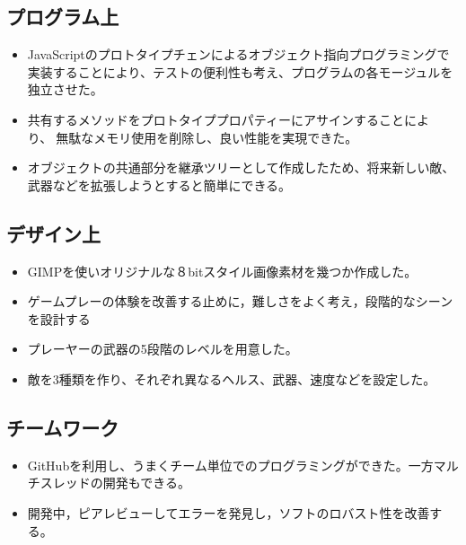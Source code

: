 	\subsection{プログラム上}
		\begin{itemize}
			\item JavaScriptのプロトタイプチェンによるオブジェクト指向プログラミングで実装することにより、テストの便利性も考え、プログラムの各モージュルを独立させた。
			\item 共有するメソッドをプロトタイププロパティーにアサインすることにより、無駄なメモリ使用を削除し、良い性能を実現できた。
			\item オブジェクトの共通部分を継承ツリーとして作成したため、将来新しい敵、武器などを拡張しようとすると簡単にできる。
		\end{itemize}
	\subsection{デザイン上}
		\begin{itemize}
			\item GIMPを使いオリジナルな８bitスタイル画像素材を幾つか作成した。
			\item ゲームプレーの体験を改善する止めに，難しさをよく考え，段階的なシーンを設計する
			\item プレーヤーの武器の5段階のレベルを用意した。
			\item 敵を3種類を作り、それぞれ異なるヘルス、武器、速度などを設定した。
		\end{itemize}
	\subsection{チームワーク}
		\begin{itemize}
			\item GitHubを利用し、うまくチーム単位でのプログラミングができた。一方マルチスレッドの開発もできる。
			\item 開発中，ピアレビューしてエラーを発見し，ソフトのロバスト性を改善する。
		\end{itemize}